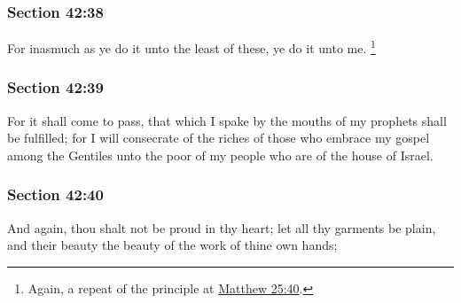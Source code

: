 	\subsubsection{Section 42:38} %
		\label{DC42-38}

		For inasmuch as ye do it unto the least of these, ye do it unto me.%
			\footnote{%
				Again, a repeat of the principle at \hyperref[MATTHEW-25-40]{Matthew 25:40}.
				}


	\subsubsection{Section 42:39} %
		\label{DC42-39}

		For it shall come to pass, that which I spake by the mouths of my prophets shall be fulfilled; for I will consecrate of the riches of those who embrace my gospel among the Gentiles unto the poor of my people who are of the house of Israel.


	\subsubsection{Section 42:40} %
		\label{DC42-40}

		And again, thou shalt not be proud in thy heart; let all thy garments be plain, and their beauty the beauty of the work of thine own hands;


